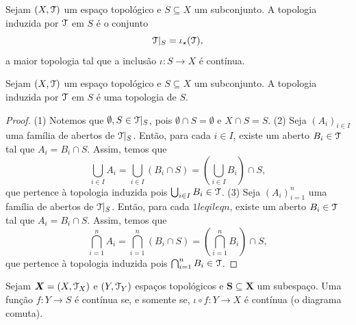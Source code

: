 \begin{proposition}
Sejam $(X,\mathcal{T})$ um espaço topológico e $S \subseteq X$ um subconjunto. A topologia induzida por $\mathcal{T}$ em $S$ é o conjunto
	\begin{equation*}
	\mathcal{T}|_S = \iota_\star(\mathcal{T}),
	\end{equation*}
a maior topologia tal que a inclusão $\iota: S \to X$ é contínua.
\end{proposition}

\begin{proposition}
Sejam $(X,\mathcal{T})$ um espaço topológico e $S \subseteq X$ um subconjunto. A topologia induzida por $\mathcal{T}$ em $S$ é uma topologia de $S$.
\end{proposition}
\begin{proof}
(1) Notemos que $\emptyset,S \in \mathcal{T}|_S$, pois $\emptyset \cap S = \emptyset$ e $X \cap S = S$. (2) Seja $(A_i)_{i \in I}$ uma família de abertos de $\mathcal{T}|_S$. Então, para cada $i \in I$, existe um aberto $B_i \in \mathcal{T}$ tal que $A_i = B_i \cap S$. Assim, temos que
	\begin{equation*}
	\bigcup_{i \in I} A_i = \bigcup_{i \in I} (B_i \cap S) = \left( \bigcup_{i \in I} B_i \right) \cap S,
	\end{equation*}
que pertence à topologia induzida pois $\bigcup_{i \in I} B_i \in \mathcal{T}$. (3) Seja $(A_i)_{i=1}^n$ uma família de abertos de $\mathcal{T}|_S$. Então, para cada $1 leq i leq n$, existe um aberto $B_i \in \mathcal{T}$ tal que $A_i = B_i \cap S$. Assim, temos que
	\begin{equation*}
	\bigcap_{i=1}^n A_i = \bigcap_{i=1}^n (B_i \cap S) = \left( \bigcap_{i=1}^n B_i \right) \cap S,
	\end{equation*}
que pertence à topologia induzida pois $\bigcap_{i=1}^n B_i \in \mathcal{T}$.
\end{proof}

\begin{proposition}
Sejam $\bm X=(X,\mathcal{T}_X)$ e $(Y,\mathcal{T}_Y)$ espaços topológicos e $\bm S \subseteq \bm X$ um subespaço. Uma função $f\colon Y \to S$ é contínua se, e somente se, $\iota \circ f: Y \to X$ é contínua (o diagrama comuta).
\begin{figure}
\centering
{}
\end{figure}
\end{proposition}

